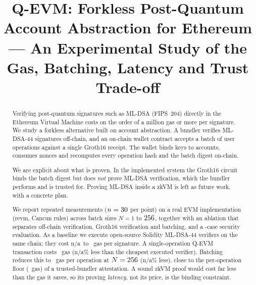 \documentclass[conference]{IEEEtran}
\providecommand{\NativeExec}{n/a}
\providecommand{\RedExecOne}{n/a}
\providecommand{\RedExecMax}{n/a}
\begin{document}
\title{Q-EVM: Forkless Post-Quantum Account Abstraction for Ethereum --- An Experimental Study of the Gas, Batching, Latency and Trust Trade-off}

\author{
\and
{}
}

\maketitle

\begin{abstract}
Verifying post-quantum signatures such as ML-DSA (FIPS~204) directly in the Ethereum Virtual Machine costs on the order of a million gas or more per signature. We study a forkless alternative built on account abstraction. A bundler verifies ML-DSA-44 signatures off-chain, and an on-chain wallet contract accepts a batch of user operations against a single Groth16 receipt. The wallet binds keys to accounts, consumes nonces and recomputes every operation hash and the batch digest on-chain.

We are explicit about what is proven. In the implemented system the Groth16 circuit binds the batch digest but does \emph{not} prove ML-DSA verification, which the bundler performs and is trusted for. Proving ML-DSA inside a zkVM is left as future work, with a concrete plan.

We report repeated measurements ($n=30$ per point) on a real EVM implementation (revm, Cancun rules) across batch sizes $N=1$ to $256$, together with an ablation that separates off-chain verification, Groth16 verification and batching, and a \SecCases-case security evaluation. As a baseline we execute open-source Solidity ML-DSA-44 verifiers on the same chain; they cost \NativeExec\ to \NativeExecMain\ gas per signature. A single-operation Q-EVM transaction costs \SingleOpGas\ gas (\RedExecOne\% less than the cheapest executed verifier). Batching reduces this to \BatchMaxGas\ gas per operation at $N=256$ (\RedExecMax\% less), close to the per-operation floor (\AttestMaxGas\ gas) of a trusted-bundler attestation. A sound zkVM proof would cost far less than the gas it saves, so its proving \emph{latency}, not its price, is the binding constraint.
\end{abstract}
\end{document}

